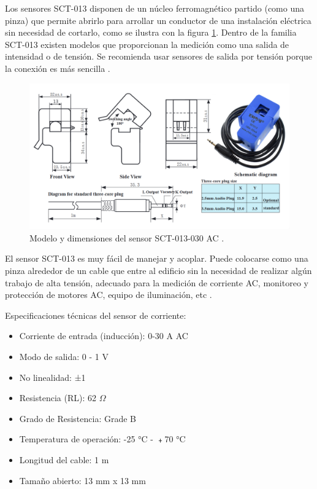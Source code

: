 Los sensores SCT-013 disponen de un núcleo ferromagnético partido (como una pinza) que permite abrirlo para arrollar un conductor de una instalación eléctrica sin necesidad de cortarlo, como se ilustra con la figura \ref{fig:sensorCorriente}. Dentro de la familia SCT-013 existen modelos que proporcionan la medición como una salida de intensidad o de tensión. Se recomienda usar sensores de salida por tensión porque la conexión es más sencilla \citep{WEBSITE:9}. 

\begin{figure}[htbp]
	\centering
	\includegraphics[width=1.0\textwidth]{./Figures/sensorCorriente2.png}
	\caption{Modelo y dimensiones del sensor SCT-013-030 AC \protect\footnotemark.}

	\label{fig:sensorCorriente}
\end{figure}


El sensor SCT-013 es muy fácil de manejar y acoplar. Puede colocarse como una pinza alrededor de un cable que entre al edificio sin la necesidad de realizar algún trabajo de alta tensión, adecuado para la medición de corriente AC, monitoreo y protección de motores AC, equipo de iluminación, etc \citep{WEBSITE:10}.

Especificaciones técnicas del sensor de corriente:

\begin{itemize}
\item Corriente de entrada (inducción): 0-30 A AC
\item Modo de salida: 0 - 1 V
\item No linealidad: ±1%
\item Resistencia (RL): 62 $\Omega $
\item Grado de Resistencia: Grade B
\item Temperatura de operación: -25 °C - ﹢70 °C
\item Longitud del cable: 1 m
\item Tamaño abierto: 13 mm x 13 mm
\end{itemize}

